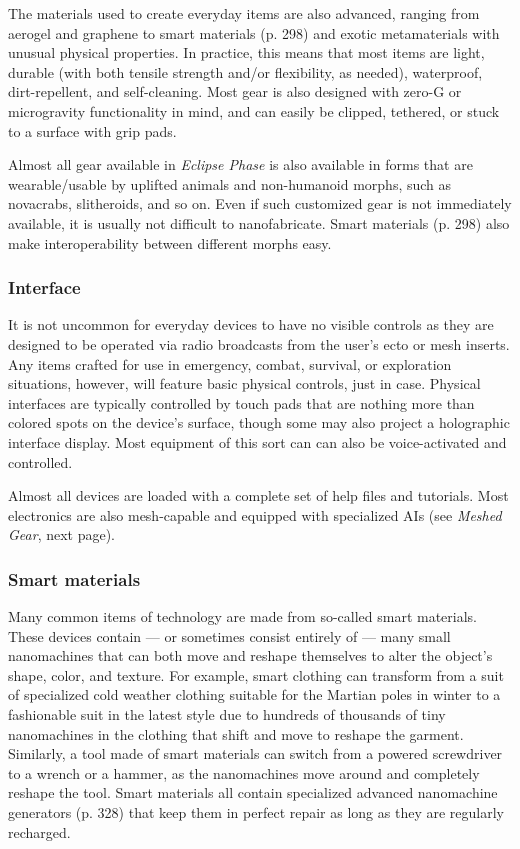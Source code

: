 The materials used to create everyday items are also advanced, ranging from aerogel and graphene to smart materials (p. 298) and exotic metamaterials with unusual physical properties. In practice, this means that most items are light, durable (with both tensile strength and/or flexibility, as needed), waterproof, dirt-repellent, and self-cleaning. Most gear is also designed with zero-G or microgravity functionality in mind, and can easily be clipped, tethered, or stuck to a surface with grip pads.

Almost all gear available in \emph{Eclipse Phase} is also available in forms that are wearable/usable by uplifted animals and non-humanoid morphs, such as novacrabs, slitheroids, and so on. Even if such customized gear is not immediately available, it is usually not difficult to nanofabricate. Smart materials (p. 298) also make interoperability between different morphs easy.

\subsubsection{Interface}

It is not uncommon for everyday devices to have no visible controls as they are designed to be operated via radio broadcasts from the user’s ecto or mesh inserts. Any items crafted for use in emergency, combat, survival, or exploration situations, however, will feature basic physical controls, just in case. Physical interfaces are typically controlled by touch pads that are nothing more than colored spots on the device’s surface, though some may also project a holographic interface display. Most equipment of this sort can can also be voice-activated and controlled.

Almost all devices are loaded with a complete set of help files and tutorials. Most electronics are also mesh-capable and equipped with specialized AIs (see \emph{Meshed Gear}, next page).

\subsubsection{Smart materials}

Many common items of technology are made from so-called smart materials. These devices contain --- or sometimes consist entirely of --- many small nanomachines that can both move and reshape themselves to alter the object’s shape, color, and texture. For example, smart clothing can transform from a suit of specialized cold weather clothing suitable for the Martian poles in winter to a fashionable suit in the latest style due to hundreds of thousands of tiny nanomachines in the clothing that shift and move to reshape the garment. Similarly, a tool made of smart materials can switch from a powered screwdriver to a wrench or a hammer, as the nanomachines move around and completely reshape the tool. Smart materials all contain specialized advanced nanomachine generators (p. 328) that keep them in perfect repair as long as they are regularly recharged.


